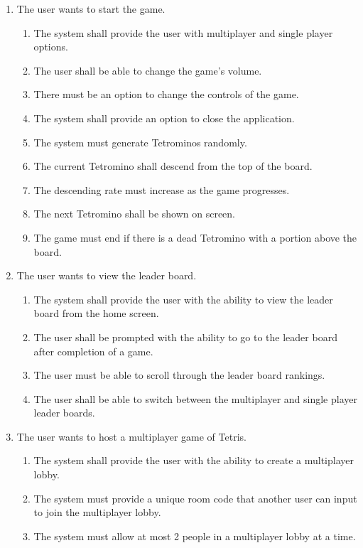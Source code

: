\documentclass[12pt, titlepage]{article}
\begin{document}
\begin{enumerate}[{BE}1. ]
    \item The user wants to start the game.
    \begin{enumerate}[{FR}1. ]
    \item The system shall provide the user with multiplayer and single player options.
    \item The user shall be able to change the game's volume.
    \item There must be an option to change the controls of the game.
    \item The system shall provide an option to close the application.
    \item The system must generate Tetrominos randomly.
    \item The current Tetromino shall descend from the top of the board.
    \item The descending rate must increase as the game progresses.
    \item The next Tetromino shall be shown on screen.
    \item The game must end if there is a dead Tetromino with a portion above the board. 
    
    \end{enumerate}
    
    \item The user wants to view the leader board.
    \begin{enumerate}[{FR}1. ]
    \item The system shall provide the user with the ability to view the leader board from the home screen.
    \item The user shall be prompted with the ability to go to the leader board after completion of a game.
    \item The user must be able to scroll through the leader board rankings.
    \item The user shall be able to switch between the multiplayer and single player leader boards.
    \end{enumerate}

    \item The user wants to host a multiplayer game of Tetris.
    \begin{enumerate}[{FR}1. ]
    \item The system shall provide the user with the ability to create a multiplayer lobby.
    \item The system must provide a unique room code that another user can input to join the multiplayer lobby.
    \item The system must allow at most 2 people in a multiplayer lobby at a time.
    \end{enumerate}


\end{enumerate}
\end{document}
